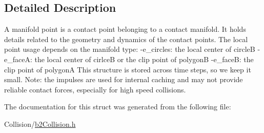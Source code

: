 \subsection{Detailed Description}
A manifold point is a contact point belonging to a contact manifold. It holds details related to the geometry and dynamics of the contact points. The local point usage depends on the manifold type\+: -\/e\+\_\+circles\+: the local center of circleB -\/e\+\_\+faceA\+: the local center of cirlceB or the clip point of polygonB -\/e\+\_\+faceB\+: the clip point of polygonA This structure is stored across time steps, so we keep it small. Note\+: the impulses are used for internal caching and may not provide reliable contact forces, especially for high speed collisions. 

The documentation for this struct was generated from the following file\+:\begin{DoxyCompactItemize}
\item 
Collision/\mbox{\hyperlink{b2Collision_8h}{b2\+Collision.\+h}}\end{DoxyCompactItemize}
